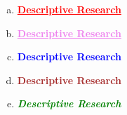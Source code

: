 \documentclass{article}
\begin{document}
	\begin{enumerate}[(a)]
		\item {\bfseries\Large\textcolor{red}{\underline{Descriptive Research}}}
		\item {\bfseries\large\textcolor{violet}{\underline{Descriptive Research}}}
		\item {\bfseries\tiny\textcolor{blue}{Descriptive Research}}
		\item {\bfseries\huge\textcolor{brown}{Descriptive Research}}
		\item {\bfseries\Huge\textcolor{green}{\textit{Descriptive Research}}}
	\end{enumerate}
\end{document}

